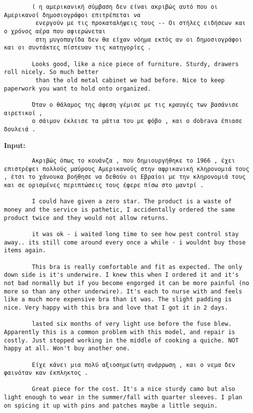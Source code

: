 \documentclass[11pt, a4paper]{article}
\begin{document}
\begin{verbatim}
		( η αμερικανική σύμβαση δεν είναι ακριβώς αυτό που οι Αμερικανοί δημοσιογράφοι επιτρέπεται να
		 ενεργούν με τις προκαταλήψεις τους -- Οι στήλες ειδήσεων και ο χρόνος αέρα που αφιερώνεται 
		 στη μυγοπαγίδα δεν θα είχαν νόημα εκτός αν οι δημοσιογράφοι και οι συντάκτες πίστευαν τις κατηγορίες .
		
		Looks good, like a nice piece of furniture. Sturdy, drawers roll nicely. So much better
		 than the old metal cabinet we had before. Nice to keep paperwork you want to hold onto organized.
		
		Όταν ο θάλαμος της άφεση γέμισε με τις κραυγές των βασάνισε αιρετικοί , 
		ο σάιμον έκλεισε τα μάτια του με φόβο , και ο dobrava έπιασε δουλειά .
	\end{verbatim}
	
	\textbf{Input:}
	\begin{verbatim}
		Ακριβώς όπως το κουάνζα , που δημιουργήθηκε το 1966 , έχει επιστρέψει πολλούς μαύρους Αμερικανούς στην αφρικανική κληρονομιά τους , έτσι το χάνουκα βοήθησε να δεθούν οι Εβραίοι με την κληρονομιά τους και σε ορισμένες περιπτώσεις τους έφερε πίσω στο μαντρί .
		
		I could have given a zero star. The product is a waste of money and the service is pathetic, I accidentally ordered the same product twice and they would not allow returns.
		
		it was ok - i waited long time to see how pest control stay away.. its still come around every once a while - i wouldnt buy those items again.
		
		This bra is really comfortable and fit as expected. The only down side is it's underwire. I knew this when I ordered it and it's not bad normally but if you become engorged it can be more painful (no more so than any other underwire). It's each to nurse with and feels like a much more expensive bra than it was. The slight padding is nice. Very happy with this bra and love that I got it in 2 days.
		
		lasted six months of very light use before the fuse blew. Apparently this is a common problem with this model, and repair is costly. Just stopped working in the middle of cooking a quiche. NOT happy at all. Won't buy another one.
		
		Είχε κάνει μια πολύ αξιοσημείωτη ανάρρωση , και ο νεμα δεν φαινόταν καν έκπληκτος .
		
		Great piece for the cost. It's a nice sturdy camo but also light enough to wear in the summer/fall with quarter sleeves. I plan on spicing it up with pins and patches maybe a little sequin.
		

\end{verbatim}
\end{document}
